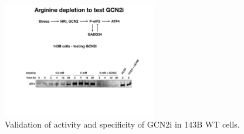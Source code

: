\begin{figure}[t]
    \centering
    \includegraphics[width=0.60\textwidth]{figures/sapp/ISR/143B_GCN2i_val.pdf}
    \caption[GCN2 inhibitor validation.]{
    Validation of activity and specificity of GCN2i in 143B WT cells.
    }
    \label{fig:sapp:ISR:143B_GCN2i_val}
\end{figure}

